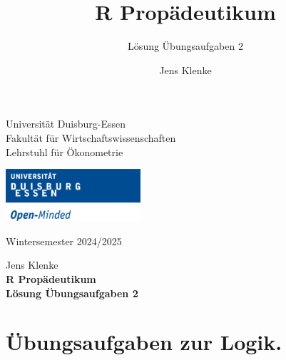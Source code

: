 \documentclass[12pt,a4paper]{article}
\title{R Propädeutikum}
\subtitle{Lösung Übungsaufgaben 2}
\author{Jens Klenke}
\date{}
\begin{document}





\restoregeometry



\begin{minipage}{0.6\textwidth}
Universität Duisburg-Essen\\
Fakultät für Wirtschaftswissenschaften\\
Lehrstuhl für Ökonometrie\\
\end{minipage}

	\begin{flushright}
	\vspace{-3cm}
	\includegraphics*[width=5cm]{includes/duelogo_en.png}\\
	\vspace{.125cm}
	\end{flushright}
\hspace{-0.005cm}Wintersemester 2024/2025

\vspace{0.05cm}

\begin{center}
	\vspace{.25cm}
	Jens Klenke \hspace{.5cm}  \\
	\vspace{.25cm}
	\textbf{\Large{R Propädeutikum}}\\
	\vspace{.25cm}
	\textbf{\large{Lösung Übungsaufgaben 2}}\\
	\vspace{.125cm}
\end{center}





\section{Übungsaufgaben zur Logik.}\label{uxfcbungsaufgaben-zur-logik.}
\end{document}
